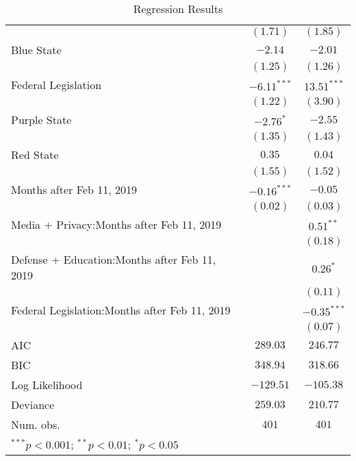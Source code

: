 \begin{table}
\begin{center}
\begin{tabular}{l c c}
                                                  & $(1.71)$      & $(1.85)$      \\
Blue State                                      & $-2.14$       & $-2.01$       \\
                                                  & $(1.25)$      & $(1.26)$      \\
Federal Legislation                             & $-6.11^{***}$ & $13.51^{***}$ \\
                                                  & $(1.22)$      & $(3.90)$      \\
Purple State                                    & $-2.76^{*}$   & $-2.55$       \\
                                                  & $(1.35)$      & $(1.43)$      \\
Red State                                       & $0.35$        & $0.04$        \\
                                                  & $(1.55)$      & $(1.52)$      \\
Months after Feb 11, 2019                       & $-0.16^{***}$ & $-0.05$       \\
                                                  & $(0.02)$      & $(0.03)$      \\
Media + Privacy:Months after Feb 11, 2019     &               & $0.51^{**}$   \\
                                                  &               & $(0.18)$      \\
Defense + Education:Months after Feb 11, 2019 &               & $0.26^{*}$    \\
                                                  &               & $(0.11)$      \\
Federal Legislation:Months after Feb 11, 2019 &               & $-0.35^{***}$ \\
                                                  &               & $(0.07)$      \\
\hline
AIC                                               & $289.03$      & $246.77$      \\
BIC                                               & $348.94$      & $318.66$      \\
Log Likelihood                                    & $-129.51$     & $-105.38$     \\
Deviance                                          & $259.03$      & $210.77$      \\
Num. obs.                                         & $401$         & $401$         \\
\hline
\multicolumn{3}{l}{\scriptsize{$^{***}p<0.001$; $^{**}p<0.01$; $^{*}p<0.05$}}
\end{tabular}
\caption{Regression Results}
\label{table:coefficients}
\end{center}
\end{table}
